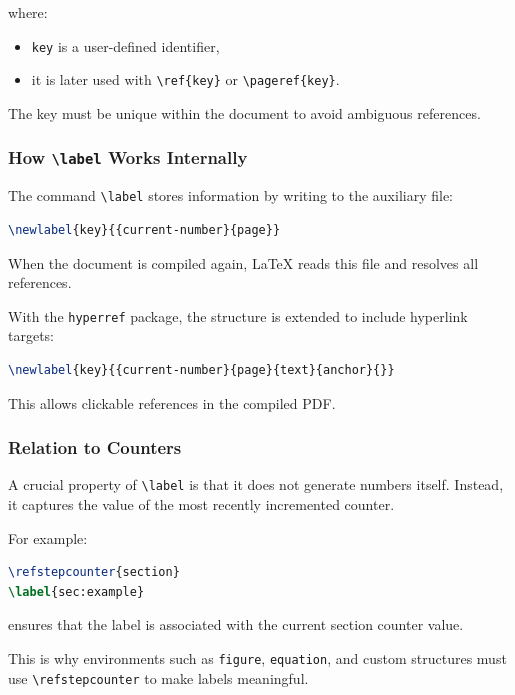 where:

\begin{itemize}
\item \texttt{key} is a user-defined identifier,
\item it is later used with \lstinline|\ref{key}| or \lstinline|\pageref{key}|.
\end{itemize}

The key must be unique within the document to avoid ambiguous references.

\subsubsection{How \texttt{\textbackslash label} Works Internally}

The command \lstinline|\label| stores information by writing to the auxiliary file:

\begin{lstlisting}[language=LaTeX]
\newlabel{key}{{current-number}{page}}
\end{lstlisting}

When the document is compiled again, LaTeX reads this file and resolves all references.

With the \texttt{hyperref} package, the structure is extended to include hyperlink targets:

\begin{lstlisting}[language=LaTeX]
\newlabel{key}{{current-number}{page}{text}{anchor}{}}
\end{lstlisting}

This allows clickable references in the compiled PDF.

\subsubsection{Relation to Counters}

A crucial property of \lstinline|\label| is that it does not generate numbers itself. Instead, it captures the value of the most recently incremented counter.

For example:

\begin{lstlisting}[language=LaTeX]
\refstepcounter{section}
\label{sec:example}
\end{lstlisting}

ensures that the label is associated with the current section counter value.

This is why environments such as \texttt{figure}, \texttt{equation}, and custom structures must use \lstinline|\refstepcounter| to make labels meaningful.

